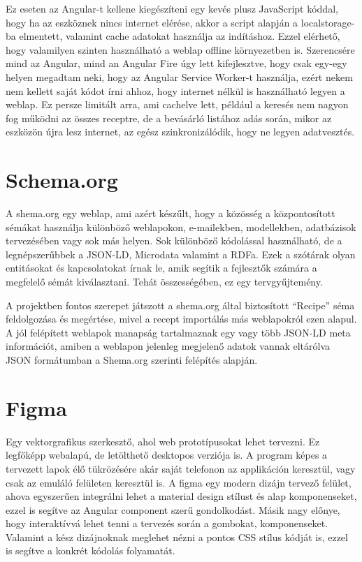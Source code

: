 \documentclass[12pt]{report}
\theoremstyle{definition}
\begin{document}
Ez eseten az Angular-t kellene kiegészíteni egy kevés plusz JavaScript kóddal, hogy ha az eszköznek nincs internet elérése, akkor a script alapján a localstorage-ba elmentett, valamint cache adatokat használja az indításhoz. Ezzel elérhető, hogy valamilyen szinten használható a weblap offline környezetben is. Szerencsére mind az Angular, mind an Angular Fire úgy lett kifejlesztve, hogy csak egy-egy helyen megadtam neki, hogy az Angular Service Worker-t használja, ezért nekem nem kellett saját kódot írni ahhoz, hogy internet nélkül is használható legyen a weblap. Ez persze limitált arra, ami cachelve lett, például a keresés nem nagyon fog működni az összes receptre, de a bevásárló listához adás során, mikor az eszközön újra lesz internet, az egész szinkronizálódik, hogy ne legyen adatvesztés.

\section{Schema.org}
A shema.org egy weblap, ami azért készűlt, hogy a közösség a központosított sémákat használja különböző weblapokon, e-mailekben, modellekben, adatbázisok tervezésében vagy sok más helyen. Sok különböző kódolással használható, de a legnépszerűbbek a JSON-LD, Microdata valamint a RDFa. Ezek a szótárak olyan entitásokat és kapcsolatokat írnak le, amik segítik a fejlesztők számára a megfelelő sémát kiválasztani. Tehát összességében, ez egy tervgyűjtemény.

A projektben fontos szerepet játszott a shema.org által biztosított “Recipe” séma feldolgozása és megértése, mivel a recept importálás más weblapokról ezen alapul. A jól felépített weblapok manapság tartalmaznak egy vagy több JSON-LD meta információt, amiben a weblapon jelenleg megjelenő adatok vannak eltárólva JSON formátumban a Shema.org szerinti felépítés alapján.

\section{Figma}
Egy  vektorgrafikus szerkesztő, ahol web prototípusokat lehet tervezni. Ez legfőképp webalapú, de letölthető desktopos verziója is. A program képes a tervezett lapok élő tükrözésére akár saját telefonon az applikáción keresztül, vagy csak az emuláló felületen keresztül is. A figma egy modern dizájn tervező felület, ahova egyszerűen integrálni lehet a material design stílust és alap komponenseket, ezzel is segítve az Angular component szerű gondolkodást. Másik nagy előnye, hogy interaktívvá lehet tenni a tervezés során a gombokat, komponenseket. Valamint a kész dizájnoknak meglehet nézni a pontos CSS stílus kódját is, ezzel is segítve a konkrét kódolás folyamatát.
\end{document}
